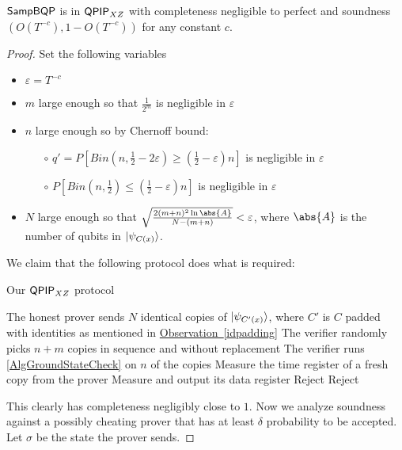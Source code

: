 \begin{theorem}
	$\operatorname{\mathsf{SampBQP}}$ is in $\operatorname{\mathsf{QPIP}}_{XZ}$ with completeness negligible to perfect and soundness $(O(T^{-c}), 1-O(T^{-c}))$ for any constant $c$.
\end{theorem}
\begin{proof}
	Set the following variables
	\begin{itemize}
		\item $\varepsilon=T^{-c}$
		\item $m$ large enough so that $\frac{1}{2^m}$ is negligible in $\varepsilon$
		\item $n$ large enough so by Chernoff bound:
			\begin{itemize}
				\item[$\circ$] $q'=P\left[Bin(n, \frac{1}{2}-2\varepsilon)\geq\left(\frac{1}{2}-\varepsilon\right)n\right]$ is negligible in $\varepsilon$
				\item[$\circ$] $P\left[Bin(n, \frac{1}{2})\leq\left(\frac{1}{2}-\varepsilon\right)n\right]$ is negligible in $\varepsilon$
			\end{itemize}
		\item $N$ large enough so that $\sqrt{\frac{2(m+n)^2\ln\abs{A}}{N-(m+n)}}<\varepsilon$, where $\abs{A}$ is the number of qubits in $\ket{\psi_{C(x)}}$.
	\end{itemize}

	We claim that the following protocol does what is required:
	\begin{algorithm}
		\caption{Our $\operatorname{\mathsf{QPIP}}_{XZ}$ protocol}
		\label{AlgAmp1}
		\begin{algorithmic}[1]
			\State The honest prover sends $N$ identical copies of $\ket{\psi_{C'(x)}}$, where $C'$ is $C$ padded with identities as mentioned in \hyperref[idpadding]{Observation~\ref*{idpadding}}
			\State The verifier randomly picks $n+m$ copies in sequence and without replacement
			\State The verifier runs \autoref{AlgGroundStateCheck} on $n$ of the copies
				\State Measure the time register of a fresh copy from the prover
					\State Measure and output its data register
				\EndIf
			\EndFor
			\State Reject
			\Else
			\State Reject
			\EndIf
		\end{algorithmic}
	\end{algorithm}

	This clearly has completeness negligibly close to $1$. Now we analyze soundness against a possibly cheating prover that has at least $\delta$ probability to be accepted. Let $\sigma$ be the state the prover sends.


\end{proof}
